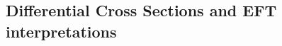 %
% 
%
%
% 

\clearpage 

\subsection{Differential Cross Sections and EFT interpretations}
\label{sec:diff_xsec}
 
